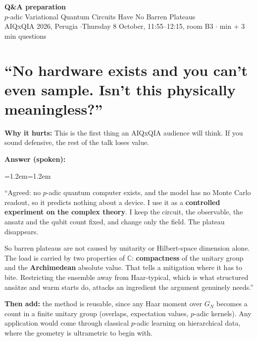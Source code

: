 \documentclass[11pt,a4paper]{article}
\newenvironment{answer}
  {\par\noindent\textbf{\color{navy}Answer (spoken):}\par
   \begin{list}{}{\leftmargin=1.2em\rightmargin=1.2em}\item\relax}
  {\end{list}}
\newcommand{\why}[1]{\par\noindent\textbf{Why it hurts:} #1\par}
\begin{document}
\begin{center}
  {\LARGE\bfseries\color{navy} Q\&A preparation}\\[0.4em]
  {\large $p$-adic Variational Quantum Circuits Have No Barren Plateaus}\\[0.3em]
  AIQxQIA 2026, Perugia \quad$\cdot$\quad Thursday 8 October, 11:55--12:15,
  room B3 \quad$\cdot$ min + 3 min questions
\end{center}

\medskip
\noindent{}

\section{``No hardware exists and you can't even sample. Isn't this physically meaningless?''}

\why{This is the first thing an AIQxQIA audience will think. If you sound
defensive, the rest of the talk loses value.}

\begin{answer}
``Agreed: no $p$-adic quantum computer exists, and the model has no Monte
Carlo readout, so it predicts nothing about a device. I use it as a
\textbf{controlled experiment on the complex theory}. I keep the circuit, the
observable, the ansatz and the qubit count fixed, and change only the field.
The plateau disappears.

So barren plateaus are not caused by unitarity or Hilbert-space dimension
alone. The load is carried by two properties of $\mathbb{C}$:
\textbf{compactness} of the unitary group and the \textbf{Archimedean}
absolute value. That tells a mitigation where it has to bite. Restricting the
ensemble away from Haar-typical, which is what structured ans\"atze and warm
starts do, attacks an ingredient the argument genuinely needs.''
\end{answer}

\textbf{Then add:} the method is reusable, since any Haar moment over $G_N$
becomes a count in a finite unitary group (overlaps, expectation values,
$p$-adic kernels). Any application would come through classical $p$-adic
learning on hierarchical data, where the geometry is ultrametric to begin with.
\end{document}
